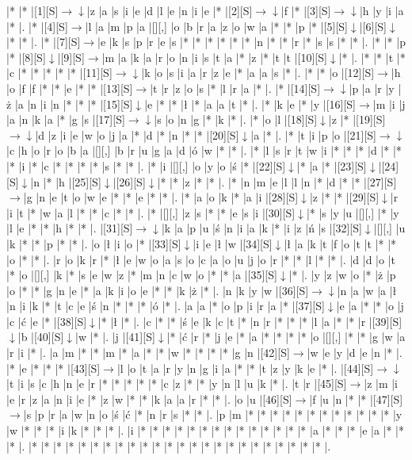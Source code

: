 \documentclass[11pt]{article}
\newcommand\drarr{$\rightarrow \!\!\!\!\! \downarrow$}
\newcommand\rarr{$\rightarrow$}
\newcommand\darr{$\downarrow$}
\begin{document}
\noindent\begin{Puzzle}{23}{31}|*	|*	|[1][S]\drarr	|z	|a	|s	|i	|e	|d	|l	|e	|n	|i	|e	|*	|[2][S]\drarr	|f	|*	|[3][S]\drarr	|h	|y	|i	|a	|*	|.
|*	|[4][S]\rarr	|l	|a	|m	|p	|a	|[][,]{ }	|o	|b	|r	|a	|z	|o	|w	|a	|*	|*	|p	|*	|[5][S]\darr	|[6][S]\darr	|*	|*	|.
|*	|[7][S]\rarr	|e	|k	|s	|p	|r	|e	|s	|*	|*	|*	|*	|*	|*	|n	|*	|*	|r	|*	|s	|s	|*	|*	|.
|*	|*	|p	|*	|[8][S]\darr	|[9][S]\rarr	|m	|a	|k	|a	|r	|o	|n	|i	|s	|t	|a	|*	|z	|*	|t	|t	|[10][S]\darr	|*	|.
|*	|*	|t	|*	|c	|*	|*	|*	|*	|*	|[11][S]\drarr	|k	|o	|s	|i	|a	|r	|z	|e	|*	|a	|a	|s	|*	|.
|*	|*	|o	|[12][S]\rarr	|h	|o	|f	|f	|*	|*	|e	|*	|*	|[13][S]\rarr	|t	|r	|z	|o	|s	|*	|l	|r	|a	|*	|.
|*	|[14][S]\drarr	|p	|a	|r	|y	|ż	|a	|n	|i	|n	|*	|*	|*	|[15][S]\darr	|e	|*	|*	|ł	|*	|a	|a	|t	|*	|.
|*	|k	|e	|*	|y	|[16][S]\rarr	|m	|i	|j	|a	|n	|k	|a	|*	|g	|s	|[17][S]\drarr	|s	|o	|n	|g	|*	|k	|*	|.
|*	|o	|l	|[18][S]\darr	|z	|*	|[19][S]\drarr	|d	|z	|i	|e	|w	|o	|j	|a	|*	|d	|*	|n	|*	|*	|[20][S]\darr	|a	|*	|.
|*	|t	|i	|p	|o	|[21][S]\drarr	|c	|h	|o	|r	|o	|b	|a	|[][,]{ }	|b	|r	|u	|g	|a	|d	|ó	|w	|*	|*	|.
|*	|l	|s	|r	|t	|w	|i	|*	|*	|*	|d	|*	|*	|*	|i	|*	|c	|*	|*	|*	|*	|s	|*	|*	|.
|*	|i	|[][,]{ }	|o	|y	|o	|ś	|*	|[22][S]\darr	|*	|a	|*	|[23][S]\darr	|[24][S]\darr	|n	|*	|h	|[25][S]\darr	|[26][S]\darr	|*	|*	|z	|*	|*	|.
|*	|n	|m	|e	|l	|l	|n	|*	|d	|*	|*	|[27][S]\rarr	|g	|n	|e	|t	|o	|w	|e	|*	|*	|e	|*	|*	|.
|*	|a	|o	|k	|*	|a	|i	|[28][S]\darr	|z	|*	|*	|[29][S]\darr	|r	|i	|t	|*	|w	|a	|l	|*	|*	|c	|*	|*	|.
|*	|[][,]{ }	|z	|s	|*	|*	|e	|s	|i	|[30][S]\darr	|*	|s	|y	|u	|[][,]{ }	|*	|y	|l	|e	|*	|*	|h	|*	|*	|.
|[31][S]\drarr	|k	|a	|p	|u	|ś	|n	|i	|a	|k	|*	|i	|z	|ń	|s	|[32][S]\darr	|[][,]{ }	|u	|k	|*	|*	|p	|*	|*	|.
|o	|ł	|i	|o	|*	|[33][S]\darr	|i	|e	|ł	|w	|[34][S]\darr	|ł	|a	|k	|t	|f	|o	|t	|t	|*	|*	|o	|*	|*	|.
|r	|o	|k	|r	|*	|ł	|e	|w	|o	|a	|s	|o	|c	|a	|o	|u	|j	|o	|r	|*	|*	|l	|*	|*	|.
|d	|d	|o	|t	|*	|o	|[][,]{ }	|k	|*	|s	|e	|w	|z	|*	|m	|n	|c	|w	|o	|*	|*	|a	|[35][S]\darr	|*	|.
|y	|z	|w	|o	|*	|ż	|p	|o	|*	|*	|g	|n	|e	|*	|a	|k	|i	|o	|e	|*	|*	|k	|ż	|*	|.
|n	|k	|y	|w	|[36][S]\drarr	|n	|a	|w	|a	|ł	|n	|i	|k	|*	|t	|c	|e	|ś	|n	|*	|*	|*	|ó	|*	|.
|a	|a	|*	|o	|p	|i	|r	|a	|*	|[37][S]\darr	|e	|a	|*	|*	|o	|j	|c	|ć	|e	|*	|[38][S]\darr	|*	|ł	|*	|.
|c	|*	|*	|ś	|e	|k	|c	|t	|*	|n	|r	|*	|*	|*	|l	|a	|*	|*	|r	|[39][S]\darr	|b	|[40][S]\darr	|w	|*	|.
|j	|[41][S]\darr	|*	|ć	|r	|*	|j	|e	|*	|a	|*	|*	|*	|*	|o	|[][,]{ }	|*	|*	|g	|w	|a	|r	|i	|*	|.
|a	|m	|*	|*	|m	|*	|a	|*	|*	|w	|*	|*	|*	|*	|g	|n	|[42][S]\rarr	|w	|e	|y	|d	|e	|n	|*	|.
|*	|e	|*	|*	|*	|[43][S]\rarr	|l	|o	|t	|a	|r	|y	|n	|g	|i	|a	|*	|*	|t	|z	|y	|k	|e	|*	|.
|[44][S]\drarr	|t	|i	|s	|c	|h	|n	|e	|r	|*	|*	|*	|*	|*	|c	|z	|*	|*	|y	|n	|l	|u	|k	|*	|.
|t	|r	|[45][S]\rarr	|z	|m	|i	|e	|r	|z	|a	|n	|i	|e	|*	|z	|w	|*	|*	|k	|a	|a	|r	|*	|*	|.
|o	|u	|[46][S]\rarr	|f	|u	|n	|*	|*	|[47][S]\rarr	|s	|p	|r	|a	|w	|n	|o	|ś	|ć	|*	|n	|r	|s	|*	|*	|.
|p	|m	|*	|*	|*	|*	|*	|*	|*	|*	|*	|*	|*	|*	|y	|w	|*	|*	|*	|i	|k	|*	|*	|*	|.
|i	|*	|*	|*	|*	|*	|*	|*	|*	|*	|*	|*	|*	|*	|*	|a	|*	|*	|*	|e	|a	|*	|*	|*	|.
|*	|*	|*	|*	|*	|*	|*	|*	|*	|*	|*	|*	|*	|*	|*	|*	|*	|*	|*	|*	|*	|*	|*	|*	|.\end{Puzzle}
\end{document}
